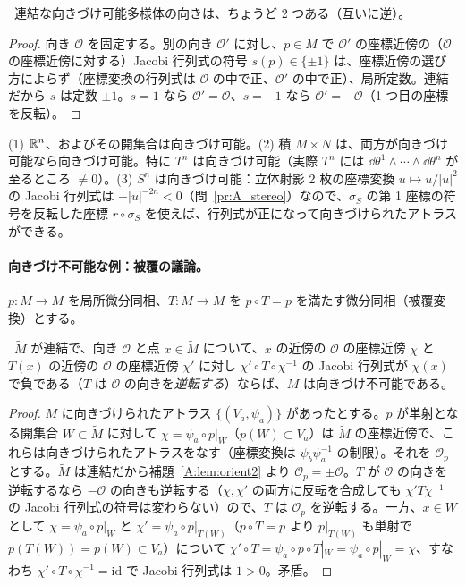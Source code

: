 \begin{lem}\label{A:lem:orient2}
\tP\ 連結な向きづけ可能多様体の向きは、ちょうど 2 つある（互いに逆）。
\end{lem}
\begin{proof}
向き $\mathcal O$ を固定する。別の向き $\mathcal O'$ に対し、$p\in M$ で $\mathcal O'$ の座標近傍の（$\mathcal O$ の座標近傍に対する）Jacobi 行列式の符号 $s(p)\in\{\pm1\}$ は、座標近傍の選び方によらず（座標変換の行列式は $\mathcal O$ の中で正、$\mathcal O'$ の中で正）、局所定数。連結だから $s$ は定数 $\pm1$。$s=1$ なら $\mathcal O'=\mathcal O$、$s=-1$ なら $\mathcal O'=-\mathcal O$（1 つ目の座標を反転）。
\end{proof}

\begin{ex}
(1) $\mathbb R^n$、およびその開集合は向きづけ可能。(2) 積 $M\times N$ は、両方が向きづけ可能なら向きづけ可能。特に $T^n$ は向きづけ可能（実際 $T^n$ には $\dd\theta^1\wedge\cdots\wedge\dd\theta^n$ が至るところ $\ne0$）。(3) $S^n$ は向きづけ可能：立体射影 2 枚の座標変換 $u\mapsto u/|u|^2$ の Jacobi 行列式は \mbox{$-|u|^{-2n}<0$}（問~\ref{pr:A_stereo}）なので、$\sigma_S$ の第 1 座標の符号を反転した座標 $r\circ\sigma_S$ を使えば、行列式が正になって向きづけられたアトラスができる。
\end{ex}

\paragraph{向きづけ不可能な例：被覆の議論。}$p:\tilde M\to M$ を局所微分同相、$T:\tilde M\to\tilde M$ を $p\circ T=p$ を満たす微分同相（被覆変換）とする。

\begin{lem}\label{A:lem:covorient}
\tP\ $\tilde M$ が連結で、向き $\mathcal O$ と点 $x\in\tilde M$ について、$x$ の近傍の $\mathcal O$ の座標近傍 $\chi$ と $T(x)$ の近傍の $\mathcal O$ の座標近傍 $\chi'$ に対し $\chi'\circ T\circ\chi^{-1}$ の Jacobi 行列式が $\chi(x)$ で負である（$T$ は $\mathcal O$ の向きを\emph{逆転する}）ならば、$M$ は向きづけ不可能である。
\end{lem}
\begin{proof}
$M$ に向きづけられたアトラス $\{(V_a,\psi_a)\}$ があったとする。$p$ が単射となる開集合 $W\subset\tilde M$ に対して $\chi=\psi_a\circ p|_W$（$p(W)\subset V_a$）は $\tilde M$ の座標近傍で、これらは向きづけられたアトラスをなす（座標変換は $\psi_b\psi_a^{-1}$ の制限）。それを $\mathcal O_p$ とする。$\tilde M$ は連結だから補題~\ref{A:lem:orient2} より $\mathcal O_p=\pm\mathcal O$。$T$ が $\mathcal O$ の向きを逆転するなら $-\mathcal O$ の向きも逆転する（$\chi,\chi'$ の両方に反転を合成しても $\chi'T\chi^{-1}$ の Jacobi 行列式の符号は変わらない）ので、$T$ は $\mathcal O_p$ を逆転する。一方、$x\in W$ として $\chi=\psi_a\circ p|_W$ と $\chi'=\psi_a\circ p|_{T(W)}$（$p\circ T=p$ より $p|_{T(W)}$ も単射で $p(T(W))=p(W)\subset V_a$）について $\chi'\circ T=\psi_a\circ p\circ T|_W=\psi_a\circ p|_W=\chi$、すなわち $\chi'\circ T\circ\chi^{-1}=\mathrm{id}$ で Jacobi 行列式は $1>0$。矛盾。
\end{proof}

